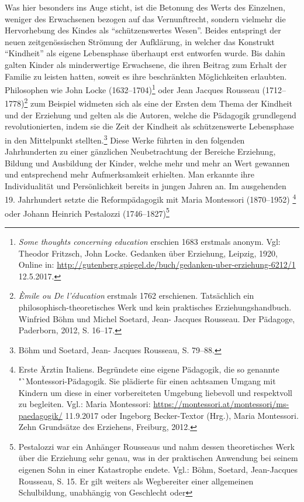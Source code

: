 \documentclass[
    a4paper,
    12pt,
    hyphens,
    chapterprefix=true,
    headheight=33pt,
    footheight=29pt,
    headings=optiontohead, %
]{scrartcl}
\begin{document}
{Was hier besonders ins Auge sticht, ist die Betonung des Werts des Einzelnen, weniger des Erwachsenen bezogen auf das Vernunftrecht, sondern vielmehr die Hervorhebung des Kindes als "`schützenswertes Wesen"'. Beides entspringt der neuen zeitgenössischen Strömung der Aufklärung, in welcher das Konstrukt "`Kindheit"' als eigene Lebensphase überhaupt erst entworfen wurde. Bis dahin galten Kinder als minderwertige Erwachsene, die ihren Beitrag zum Erhalt der Familie zu leisten hatten, soweit es ihre beschränkten Möglichkeiten erlaubten.
Philosophen wie John Locke (1632--1704)\footnote{\textit{Some thoughts concerning education} erschien 1683 erstmals anonym. Vgl: Theodor
Fritzsch, John Locke. Gedanken über Erziehung, Leipzig, 1920, Online in: \url{http://gutenberg.spiegel.de/buch/gedanken-uber-erziehung-6212/1}
12.5.2017.} oder Jean Jacques Rousseau (1712--1778)\footnote{\textit{Èmile ou De l'éducation} erstmals 1762 erschienen. Tatsächlich ein philosophisch-theoretisches Werk und kein praktisches Erziehungshandbuch. Winfried Böhm und Michel Soetard, Jean-
Jacques Rousseau. Der Pädagoge, Paderborn, 2012, S. 16--17.} zum Beispiel widmeten
sich als eine der Ersten dem Thema der Kindheit und der Erziehung und gelten als die Autoren, welche die Pädagogik grundlegend revolutionierten,
indem sie die Zeit der Kindheit als schützenswerte Lebensphase in den Mittelpunkt stellten.\footnote{Böhm und Soetard, Jean-
Jacques Rousseau, S. 79--88.} Diese Werke führten in den folgenden Jahrhunderten zu einer gänzlichen Neubetrachtung der
Bereiche Erziehung, Bildung und Ausbildung der Kinder, welche mehr und mehr an Wert gewannen und entsprechend mehr Aufmerksamkeit erhielten. Man
erkannte ihre Individualität und Persönlichkeit bereits in jungen Jahren an. Im ausgehenden 19. Jahrhundert setzte die Reformpädagogik mit Maria
Montessori (1870--1952)
\footnote{Erste Ärztin Italiens. Begründete eine eigene Pädagogik, die so genannte "`Montessori-Pädagogik. Sie plädierte
für einen achtsamen Umgang mit Kindern um diese in einer vorbereiteten Umgebung liebevoll und respektvoll zu begleiten. Vgl.: Maria Montessori:
\url{https://montessori.at/montessori/ms-paedagogik/} 11.9.2017 oder Ingeborg Becker-Textor (Hrg.), Maria Montessori. Zehn Grundsätze des
Erziehens, Freiburg, 2012.}
oder Johann Heinrich Pestalozzi (1746--1827)\footnote{Pestalozzi war ein Anhänger Rousseaus und nahm dessen
theoretisches Werk über die Erziehung sehr genau, was in der praktischen Anwendung bei seinem eigenen Sohn in einer Katastrophe endete. Vgl.:
Böhm, Soetard, Jean-Jacques Rousseau, S. 15. Er gilt weiters als Wegbereiter einer allgemeinen Schulbildung, unabhängig von Geschlecht oder
}}
\end{document}
